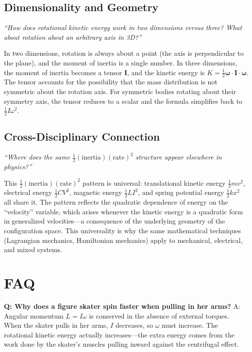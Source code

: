 \subsection*{Dimensionality and Geometry}
\textit{``How does rotational kinetic energy work in two dimensions versus three? What about rotation about an arbitrary axis in 3D?''}

In two dimensions, rotation is always about a point (the axis is perpendicular to the plane), and the moment of inertia is a single number. In three dimensions, the moment of inertia becomes a tensor $\mathbf{I}$, and the kinetic energy is $K = \frac{1}{2}\boldsymbol{\omega}\cdot\mathbf{I}\cdot\boldsymbol{\omega}$. The tensor accounts for the possibility that the mass distribution is not symmetric about the rotation axis. For symmetric bodies rotating about their symmetry axis, the tensor reduces to a scalar and the formula simplifies back to $\frac{1}{2}I\omega^2$.

\subsection*{Cross-Disciplinary Connection}
\textit{``Where does the same $\frac{1}{2}(\text{inertia})(\text{rate})^2$ structure appear elsewhere in physics?''}

This $\frac{1}{2}(\text{inertia})(\text{rate})^2$ pattern is universal: translational kinetic energy $\frac{1}{2}mv^2$, electrical energy $\frac{1}{2}CV^2$, magnetic energy $\frac{1}{2}LI^2$, and spring potential energy $\frac{1}{2}kx^2$ all share it. The pattern reflects the quadratic dependence of energy on the ``velocity'' variable, which arises whenever the kinetic energy is a quadratic form in generalized velocities---a consequence of the underlying geometry of the configuration space. This universality is why the same mathematical techniques (Lagrangian mechanics, Hamiltonian mechanics) apply to mechanical, electrical, and mixed systems.

\section*{FAQ}

\textbf{Q: Why does a figure skater spin faster when pulling in her arms?}
A: Angular momentum $L = I\omega$ is conserved in the absence of external torques. When the skater pulls in her arms, $I$ decreases, so $\omega$ must increase. The rotational kinetic energy actually increases---the extra energy comes from the work done by the skater's muscles pulling inward against the centrifugal effect.

